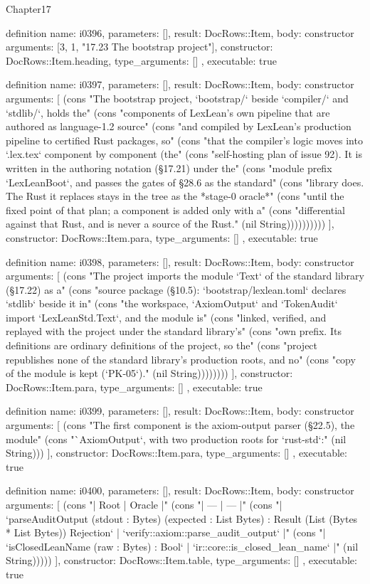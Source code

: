 \begin{lexlean}{Chapter17}
\begin{semanticmodule}
definition{
  name: i0396,
  parameters: [],
  result: DocRows::Item,
  body: constructor{
    arguments: [3, 1, "17.23 The bootstrap project"],
    constructor: DocRows::Item.heading,
    type_arguments: []
  },
  executable: true
}

definition{
  name: i0397,
  parameters: [],
  result: DocRows::Item,
  body: constructor{
    arguments: [
      (cons "The bootstrap project, `bootstrap/` beside `compiler/` and `stdlib/`, holds the" (cons "components of LexLean's own pipeline that are authored as language-1.2 source" (cons "and compiled by LexLean's production pipeline to certified Rust packages, so" (cons "that the compiler's logic moves into `.lex.tex` component by component (the" (cons "self-hosting plan of issue 92). It is written in the authoring notation (§17.21) under the" (cons "module prefix `LexLeanBoot`, and passes the gates of §28.6 as the standard" (cons "library does. The Rust it replaces stays in the tree as the *stage-0 oracle*" (cons "until the fixed point of that plan; a component is added only with a" (cons "differential against that Rust, and is never a source of the Rust." (nil String))))))))))
    ],
    constructor: DocRows::Item.para,
    type_arguments: []
  },
  executable: true
}

definition{
  name: i0398,
  parameters: [],
  result: DocRows::Item,
  body: constructor{
    arguments: [
      (cons "The project imports the module `Text` of the standard library (§17.22) as a" (cons "source package (§10.5): `bootstrap/lexlean.toml` declares `stdlib` beside it in" (cons "the workspace, `AxiomOutput` and `TokenAudit` import `LexLeanStd.Text`, and the module is" (cons "linked, verified, and replayed with the project under the standard library's" (cons "own prefix. Its definitions are ordinary definitions of the project, so the" (cons "project republishes none of the standard library's production roots, and no" (cons "copy of the module is kept (`PK-05`)." (nil String))))))))
    ],
    constructor: DocRows::Item.para,
    type_arguments: []
  },
  executable: true
}

definition{
  name: i0399,
  parameters: [],
  result: DocRows::Item,
  body: constructor{
    arguments: [
      (cons "The first component is the axiom-output parser (§22.5), the module" (cons "`AxiomOutput`, with two production roots for `rust-std`:" (nil String)))
    ],
    constructor: DocRows::Item.para,
    type_arguments: []
  },
  executable: true
}

definition{
  name: i0400,
  parameters: [],
  result: DocRows::Item,
  body: constructor{
    arguments: [
      (cons "| Root | Oracle |" (cons "| --- | --- |" (cons "| `parseAuditOutput (stdout : Bytes) (expected : List Bytes) : Result (List (Bytes * List Bytes)) Rejection` | `verify::axiom::parse_audit_output` |" (cons "| `isClosedLeanName (raw : Bytes) : Bool` | `ir::core::is_closed_lean_name` |" (nil String)))))
    ],
    constructor: DocRows::Item.table,
    type_arguments: []
  },
  executable: true
}


\end{semanticmodule}
\end{lexlean}

